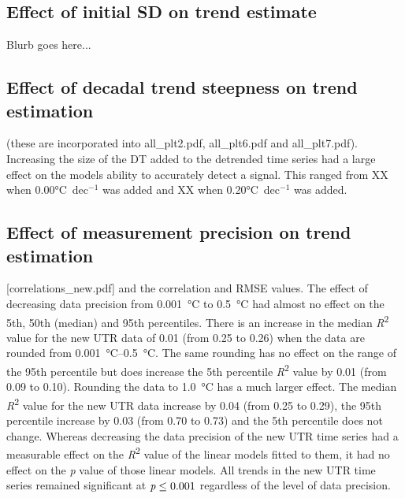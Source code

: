 \documentclass{ametsoc}
\begin{document}
\subsection{Effect of initial SD on trend estimate}
Blurb goes here...

\subsection{Effect of decadal trend steepness on trend estimation}
(these are incorporated into all_plt2.pdf, all_plt6.pdf and all_plt7.pdf).
Increasing the size of the DT added to the detrended time series had a large effect on the models ability to accurately detect a signal. This ranged from XX when 0.00\si{\degreeCelsius}~dec$^{-1}$ was added and XX when 0.20\si{\degreeCelsius}~dec$^{-1}$ was added.

\subsection{Effect of measurement precision on trend estimation}
[correlations_new.pdf] and the correlation and RMSE values.
The effect of decreasing data precision from \SI{0.001}{\degreeCelsius} to \SI{0.5}{\degreeCelsius} had almost no effect on the 5th, 50th (median) and 95th percentiles. There is an increase in the median \emph{R}\textsuperscript{2} value for the new UTR data of 0.01 (from 0.25 to 0.26) when the data are rounded from \SIrange{0.001}{0.5}{\degreeCelsius}. The same rounding has no effect on the range of the 95th percentile but does increase the 5th percentile \emph{R}\textsuperscript{2} value by 0.01 (from 0.09 to 0.10). Rounding the data to \SI{1.0}{\degreeCelsius} has a much larger effect. The median \emph{R}\textsuperscript{2} value for the new UTR data increase by 0.04 (from 0.25 to 0.29), the 95th percentile increase by 0.03 (from 0.70 to 0.73) and the 5th percentile does not change. Whereas decreasing the data precision of the new UTR time series had a measurable effect on the \emph{R}\textsuperscript{2} value of the linear models fitted to them, it had no effect on the \emph{p} value of those linear models. All trends in the new UTR time series remained significant at $\emph{p} \leq 0.001$ regardless of the level of data precision.
\end{document}

